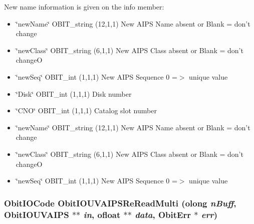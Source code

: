 New name information is given on the info member: \begin{itemize}
\item \char`\"{}new\-Name\char`\"{} OBIT\_\-string (12,1,1) New AIPS Name absent or Blank = don't change \item \char`\"{}new\-Class\char`\"{} OBIT\_\-string (6,1,1) New AIPS Class absent or Blank = don't change\-O \item \char`\"{}new\-Seq\char`\"{} OBIT\_\-int (1,1,1) New AIPS Sequence 0 =$>$ unique value 
\item \char`\"{}Disk\char`\"{} OBIT\_\-int (1,1,1) Disk number \item \char`\"{}CNO\char`\"{} OBIT\_\-int (1,1,1) Catalog slot number \item \char`\"{}new\-Name\char`\"{} OBIT\_\-string (12,1,1) New AIPS Name absent or Blank = don't change \item \char`\"{}new\-Class\char`\"{} OBIT\_\-string (6,1,1) New AIPS Class absent or Blank = don't change\-O \item \char`\"{}new\-Seq\char`\"{} OBIT\_\-int (1,1,1) New AIPS Sequence 0 =$>$ unique value 
\end{itemize}
\subsubsection{\setlength{\rightskip}{0pt plus 5cm}Obit\-IOCode Obit\-IOUVAIPSRe\-Read\-Multi ({\bf olong} {\em n\-Buff}, {\bf Obit\-IOUVAIPS} $\ast$$\ast$ {\em in}, {\bf ofloat} $\ast$$\ast$ {\em data}, {\bf Obit\-Err} $\ast$ {\em err})}\label{ObitIOUVAIPS_8h_a16}


